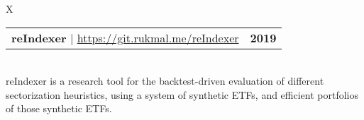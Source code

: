 \documentclass[10pt]{article}
\newcommand{\tabularxwidth}{\textwidth}
\begin{document}
        
            \vspace{.3em}
        

    

        \begin{tabularx}{\tabularxwidth}{X}
                {
                    \begin{tabularx}{\tabularxwidth}{@{}X r}
                        \textbf{reIndexer}
                            | \url{https://git.rukmal.me/reIndexer}
                        &
                        \textbf{
        2019} \\
                    \end{tabularx}
                } \\

            

            
    reIndexer is a research tool for the backtest-driven evaluation of different sectorization heuristics, using a system of synthetic ETFs, and efficient portfolios of those synthetic ETFs. \\

        \end{tabularx}

        
            \vspace{.3em}
        

    
\end{document}

